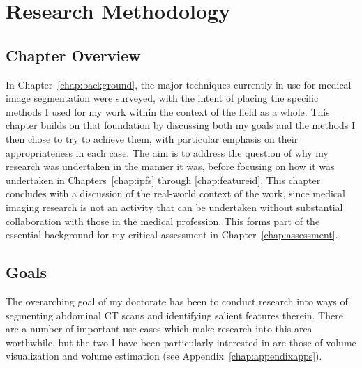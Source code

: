 \chapter{Research Methodology}
\label{chap:methodology}

\section{Chapter Overview}

In Chapter~\ref{chap:background}, the major techniques currently in use for medical image segmentation were surveyed, with the intent of placing the specific methods I used for my work within the context of the field as a whole. This chapter builds on that foundation by discussing both my goals and the methods I then chose to try to achieve them, with particular emphasis on their appropriateness in each case. The aim is to address the question of why my research was undertaken in the manner it was, before focusing on how it was undertaken in Chapters~\ref{chap:ipfs} through \ref{chap:featureid}. This chapter concludes with a discussion of the real-world context of the work, since medical imaging research is not an activity that can be undertaken without substantial collaboration with those in the medical profession. This forms part of the essential background for my critical assessment in Chapter~\ref{chap:assessment}.

\section{Goals}


The overarching goal of my doctorate has been to conduct research into ways of segmenting abdominal CT scans and identifying salient features therein. There are a number of important use cases which make research into this area worthwhile, but the two I have been particularly interested in are those of volume visualization and volume estimation (see Appendix~\ref{chap:appendixapps}).

